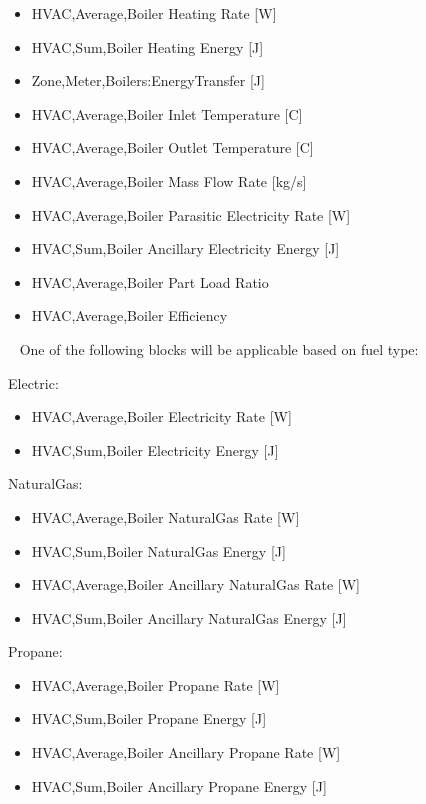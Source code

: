 \begin{itemize}
    \item
    HVAC,Average,Boiler Heating Rate {[}W{]}
    \item
    HVAC,Sum,Boiler Heating Energy {[}J{]}
    \item
    Zone,Meter,Boilers:EnergyTransfer {[}J{]}
    \item
    HVAC,Average,Boiler Inlet Temperature {[}C{]}
    \item
    HVAC,Average,Boiler Outlet Temperature {[}C{]}
    \item
    HVAC,Average,Boiler Mass Flow Rate {[}kg/s{]}
    \item
    HVAC,Average,Boiler Parasitic Electricity Rate {[}W{]}
    \item
    HVAC,Sum,Boiler Ancillary Electricity Energy {[}J{]}
    \item
    HVAC,Average,Boiler Part Load Ratio
    \item
    HVAC,Average,Boiler Efficiency
\end{itemize}

~ One of the following blocks will be applicable based on fuel type:

Electric:

\begin{itemize}
    \item
    HVAC,Average,Boiler Electricity Rate {[}W{]}
    \item
    HVAC,Sum,Boiler Electricity Energy {[}J{]}
\end{itemize}

NaturalGas:

\begin{itemize}
    \item
    HVAC,Average,Boiler NaturalGas Rate {[}W{]}
    \item
    HVAC,Sum,Boiler NaturalGas Energy {[}J{]}
    \item
    HVAC,Average,Boiler Ancillary NaturalGas Rate {[}W{]}
    \item
    HVAC,Sum,Boiler Ancillary NaturalGas Energy {[}J{]}
\end{itemize}

Propane:

\begin{itemize}
    \item
    HVAC,Average,Boiler Propane Rate {[}W{]}
    \item
    HVAC,Sum,Boiler Propane Energy {[}J{]}
    \item
    HVAC,Average,Boiler Ancillary Propane Rate {[}W{]}
    \item
    HVAC,Sum,Boiler Ancillary Propane Energy {[}J{]}
\end{itemize}


